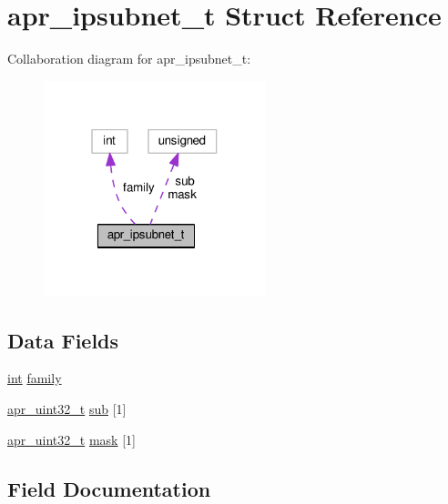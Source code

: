 \hypertarget{structapr__ipsubnet__t}{}\section{apr\+\_\+ipsubnet\+\_\+t Struct Reference}
\label{structapr__ipsubnet__t}


Collaboration diagram for apr\+\_\+ipsubnet\+\_\+t\+:
\nopagebreak
\begin{figure}[H]
\begin{center}
\leavevmode
\includegraphics[width=183pt]{structapr__ipsubnet__t__coll__graph}
\end{center}
\end{figure}
\subsection*{Data Fields}
\begin{DoxyCompactItemize}
\item 
\hyperlink{pcre_8txt_a42dfa4ff673c82d8efe7144098fbc198}{int} \hyperlink{structapr__ipsubnet__t_ab8b055c0e0513020c419fc984b0d7d65}{family}
\item 
\hyperlink{group__apr__platform_ga558548a135d8a816c4787250744ea147}{apr\+\_\+uint32\+\_\+t} \hyperlink{structapr__ipsubnet__t_a81064d3992054724c6715ae119226c56}{sub} \mbox{[}1\mbox{]}
\item 
\hyperlink{group__apr__platform_ga558548a135d8a816c4787250744ea147}{apr\+\_\+uint32\+\_\+t} \hyperlink{structapr__ipsubnet__t_a8c7ee5affd8e1d91f6aaf9dd5ffc2437}{mask} \mbox{[}1\mbox{]}
\end{DoxyCompactItemize}


\subsection{Field Documentation}
